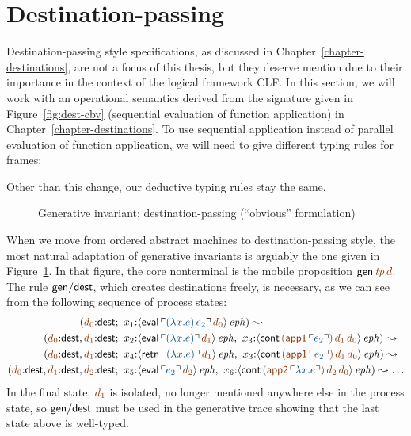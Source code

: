 \section{Destination-passing}
\label{sec:gen-destinations}

Destination-passing style specifications, as discussed in
Chapter~\ref{chapter-destinations}, are not a focus of this thesis,
but they deserve mention due to their importance in the context of the
logical framework CLF. In this section, we will work with an
operational semantics derived from the signature given in
Figure~\ref{fig:dest-cbv} (sequential evaluation of function
application) in Chapter~\ref{chapter-destinations}. To use sequential
application instead of parallel evaluation of function application, we
will need to give different typing rules for frames:

\smallskip
{}
\smallskip

\noindent
Other than this change, our deductive typing rules stay the same.


\begin{figure}[tp]
\caption{Generative invariant: destination-passing (``obvious'' formulation)}
\label{fig:gen-destinations2} 
\end{figure}

When we move from ordered abstract machines to destination-passing
style, the most natural adaptation of generative invariants is
arguably the one given in Figure~\ref{fig:gen-destinations2}. In that
figure, the core nonterminal is the mobile proposition ${\sf
  gen}\,\lf{{\it tp}}\,\lf{d}$. The rule ${\sf gen/dest}$, which 
creates destinations freely, is
necessary, as we can see from the following sequence of 
process states:
\begin{align*}
( \lf{d_0}{:}{\sf dest}&; ~
       x_1{:}\iseph{\susp{{\sf eval}
          \,\lf{\interp{(\lambda x.e)\,e_2}}\,\lf{d_0}}}
) 
\leadsto
\\
( \lf{d_0}{:}{\sf dest}, \lf{d_1}{:}{\sf dest}&; ~ 
       x_2{:}\iseph{\susp{{\sf eval}\,\lf{\interp{(\lambda x.e)}}\,\lf{d_1}}}, ~
       x_3{:}\iseph{\susp{{\sf cont}
          \,\lf{({\sf app1}\,\interp{e_2})}\,\lf{d_1}\,\lf{d_0}}}
)
\leadsto
\\
( \lf{d_0}{:}{\sf dest}, \lf{d_1}{:}{\sf dest}&; ~ 
       x_4{:}\iseph{\susp{{\sf retn}\,\lf{\interp{(\lambda x.e)}}\,\lf{d_1}}}, ~
       x_3{:}\iseph{\susp{{\sf cont}
          \,\lf{({\sf app1}\,\interp{e_2})}\,\lf{d_1}\,\lf{d_0}}}
)
\leadsto
\\
( \lf{d_0}{:}{\sf dest}, \lf{d_1}{:}{\sf dest}, \lf{d_2}{:}{\sf dest}&; ~ 
       x_5{:}\iseph{\susp{{\sf eval}\,\lf{\interp{e_2}}\,\lf{d_2}}}, ~
       x_6{:}\iseph{\susp{{\sf cont}
          \,\lf{({\sf app2}\,\interp{\lambda x.e})}\,\lf{d_2}\,\lf{d_0}}}
)
\leadsto \ldots
\end{align*}
In the final state, $\lf{d_1}$ is isolated, no longer mentioned
anywhere else in the process state, so ${\sf gen/dest}$ must be used
in the generative trace showing that the last state above is well-typed.

